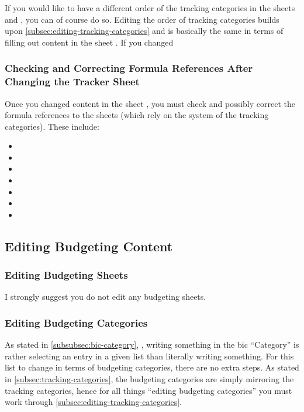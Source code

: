If you would like to have a different order of the tracking categories in the sheets  and , you can of course do so.
Editing the order of tracking categories builds upon \autoref{subsec:editing-tracking-categories} and is basically the same in terms of filling out content in the sheet .
If you changed 

\subsubsection{Checking and Correcting Formula References After Changing the Tracker Sheet}
\label{subsubsec:checking-correcting-formula-references}

Once you changed content in the sheet , you must check and possibly correct the formula references to the sheets (which rely on the system of the tracking categories).
These include:
\begin{itemize}
	\item {}
	\item {}
	\item {}
	\item {}
	\item {}
	\item {}
	\item {}
\end{itemize}

\subsection{Editing Budgeting Content}
\label{subsec:editing-budgeting-content}

\subsubsection{Editing Budgeting Sheets}
\label{subsubsec:editing-budgeting-sheets}

I strongly suggest you do not edit any budgeting sheets.

\subsubsection{Editing Budgeting Categories}
\label{subsubsec:editing-categories-for-budgeting}

As stated in \autoref{subsubsec:bic-category}, , writing something in the \ac{bic} ``Category'' is rather selecting an entry in a given list than literally writing something.
For this list to change in terms of budgeting categories, there are no extra steps.
As stated in \autoref{subsec:tracking-categories}, the budgeting categories are simply mirroring the tracking categories, hence for all things ``editing budgeting categories'' you must work through \autoref{subsec:editing-tracking-categories}.